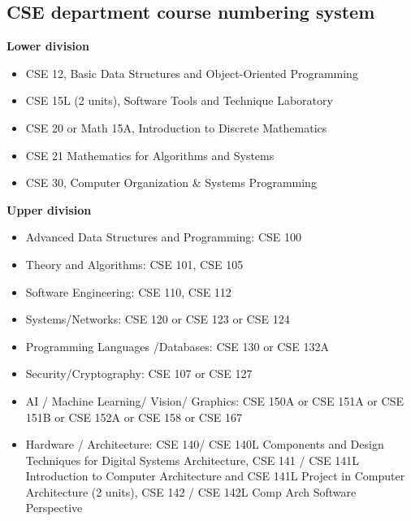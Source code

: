 \documentclass[12pt, oneside]{article}
\begin{document}
\subsection*{CSE department course numbering system}

\vspace{-15pt}

{\bf Lower division}

\vspace{-15pt}

\begin{itemize}
\setlength\itemsep{-2pt}
\item CSE 12, Basic Data Structures and Object-Oriented Programming 
\item CSE 15L (2 units), Software Tools and Technique Laboratory 
\item CSE 20 or Math 15A, Introduction to Discrete Mathematics
\item CSE 21 Mathematics for Algorithms and Systems
\item CSE 30, Computer Organization \& Systems Programming
\end{itemize}

\vspace{-15pt}

{\bf Upper division}

\vspace{-15pt}

\begin{itemize}
\setlength\itemsep{-2pt}
\item Advanced Data Structures and Programming: CSE 100
\item Theory and Algorithms: CSE 101, CSE 105
\item Software Engineering: CSE 110, CSE 112
\item Systems/Networks: CSE 120 or CSE 123 or CSE 124
\item Programming Languages /Databases: CSE 130 or CSE 132A
\item Security/Cryptography: CSE 107 or CSE 127
\item AI / Machine Learning/ Vision/ Graphics:
CSE 150A or CSE 151A or CSE 151B or CSE 152A or CSE 158 or CSE 167
\item Hardware / Architecture: CSE 140/ CSE 140L Components and Design Techniques for Digital Systems Architecture, CSE 141 / CSE 141L Introduction to Computer Architecture and CSE 141L Project in Computer Architecture (2 units), CSE 142 / CSE 142L Comp Arch Software Perspective
\end{itemize}
\end{document}
